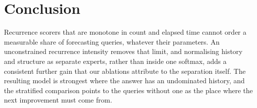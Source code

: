 \documentclass[conference]{IEEEtran}
\begin{document}
\section{Conclusion}

Recurrence scorers that are monotone in count and elapsed time cannot order a
measurable share of forecasting queries, whatever their parameters. An
unconstrained recurrence intensity removes that limit, and normalising history
and structure as separate experts, rather than inside one softmax, adds a
consistent further gain that our ablations attribute to the separation itself.
The resulting model is strongest where the answer has an undominated history, and the
stratified comparison points to the queries without one as the place where the
next improvement must come from.



\end{document}
